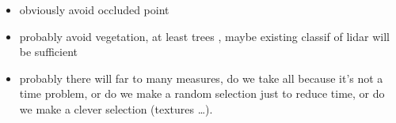 \begin{itemize}
     \item  obviously  avoid occluded point
     \item  probably   avoid vegetation, at least trees , maybe existing classif of lidar will be sufficient
     \item  probably there will far to many measures,  do we take all because it's not a time problem, 
            or do we make a random selection just to reduce time, or do we make a clever selection (textures \dots).
\end{itemize}











